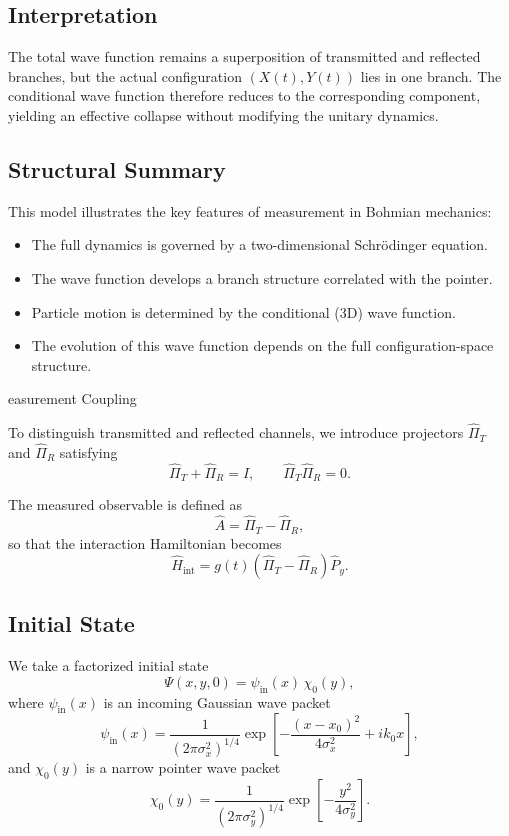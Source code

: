 {\subsection{Interpretation}

The total wave function remains a superposition of transmitted and reflected branches, but the actual configuration $(X(t),Y(t))$ lies in one branch. The conditional wave function therefore reduces to the corresponding component, yielding an effective collapse without modifying the unitary dynamics.

\subsection{Structural Summary}

This model illustrates the key features of measurement in Bohmian mechanics:

\begin{itemize}
\item The full dynamics is governed by a two-dimensional Schrödinger equation.
\item The wave function develops a branch structure correlated with the pointer.
\item Particle motion is determined by the conditional (3D) wave function.
\item The evolution of this wave function depends on the full configuration-space structure.
\end{itemize}easurement Coupling}

To distinguish transmitted and reflected channels, we introduce projectors $\hat \Pi_T$ and $\hat \Pi_R$ satisfying
\begin{equation}
\hat \Pi_T + \hat \Pi_R = I, \qquad \hat \Pi_T \hat \Pi_R = 0.
\end{equation}

The measured observable is defined as
\begin{equation}
\hat A = \hat \Pi_T - \hat \Pi_R,
\end{equation}
so that the interaction Hamiltonian becomes
\begin{equation}
\hat H_{\text{int}} = g(t)(\hat \Pi_T - \hat \Pi_R)\hat P_y.
\end{equation}

\subsection{Initial State}

We take a factorized initial state
\begin{equation}
\Psi(x,y,0) = \psi_{\text{in}}(x)\,\chi_0(y),
\end{equation}
where $\psi_{\text{in}}(x)$ is an incoming Gaussian wave packet
\begin{equation}
\psi_{\text{in}}(x) =
\frac{1}{(2\pi \sigma_x^2)^{1/4}}
\exp\left[-\frac{(x-x_0)^2}{4\sigma_x^2} + i k_0 x\right],
\end{equation}
and $\chi_0(y)$ is a narrow pointer wave packet
\begin{equation}
\chi_0(y) =
\frac{1}{(2\pi \sigma_y^2)^{1/4}}
\exp\left[-\frac{y^2}{4\sigma_y^2}\right].
\end{equation}

